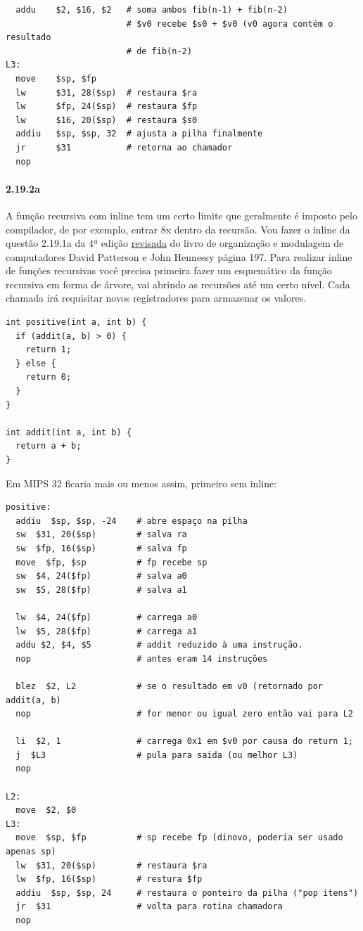 \documentclass{article}
\begin{document}
\begin{verbatim}
  addu    $2, $16, $2   # soma ambos fib(n-1) + fib(n-2)
                        # $v0 recebe $s0 + $v0 (v0 agora contém o resultado
                        # de fib(n-2)
L3:
  move    $sp, $fp
  lw      $31, 28($sp)  # restaura $ra
  lw      $fp, 24($sp)  # restaura $fp
  lw      $16, 20($sp)  # restaura $s0
  addiu   $sp, $sp, 32  # ajusta a pilha finalmente
  jr      $31           # retorna ao chamador
  nop

\end{verbatim}

\paragraph{2.19.2a}

A função recursiva com inline tem um certo limite que geralmente é imposto pelo
compilador, de por exemplo, entrar 8x dentro da recursão. Vou fazer o inline da
questão 2.19.1a da 4ª edição \underline{revisada} do livro de organização e
modulagem de computadores David Patterson e John Hennessy página 197. Para
realizar inline de funções recursivas você precisa primeira fazer um
esquemático da função recursiva em forma de árvore, vai abrindo as recursões
até um certo nível. Cada chamada irá requisitar novos registradores para
armazenar os valores.

\begin{verbatim}
int positive(int a, int b) {
  if (addit(a, b) > 0) {
    return 1;
  } else {
    return 0;
  }
}

int addit(int a, int b) {
  return a + b;
}
\end{verbatim}

Em MIPS 32 ficaria mais ou menos assim, primeiro sem inline:

\begin{verbatim}
positive:
  addiu  $sp, $sp, -24    # abre espaço na pilha
  sw  $31, 20($sp)        # salva ra
  sw  $fp, 16($sp)        # salva fp
  move  $fp, $sp          # fp recebe sp
  sw  $4, 24($fp)         # salva a0
  sw  $5, 28($fp)         # salva a1

  lw  $4, 24($fp)         # carrega a0
  lw  $5, 28($fp)         # carrega a1
  addu $2, $4, $5         # addit reduzido à uma instrução.
  nop                     # antes eram 14 instruções

  blez  $2, L2            # se o resultado em v0 (retornado por addit(a, b)
  nop                     # for menor ou igual zero então vai para L2

  li  $2, 1               # carrega 0x1 em $v0 por causa do return 1;
  j  $L3                  # pula para saida (ou melhor L3)
  nop

L2:
  move  $2, $0
L3:
  move  $sp, $fp          # sp recebe fp (dinovo, poderia ser usado apenas sp)
  lw  $31, 20($sp)        # restaura $ra
  lw  $fp, 16($sp)        # restura $fp
  addiu  $sp, $sp, 24     # restaura o ponteiro da pilha ("pop itens")
  jr  $31                 # volta para rotina chamadora
  nop
\end{verbatim}
\end{document}
